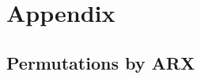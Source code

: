 \section*{Appendix}

\renewcommand\thesubsection{\Alph{subsection}}

\subsection{Permutations by ARX}
\label{ssec:permarx}

\begin{figure}

\vspace{-5mm}
\end{figure}




%
